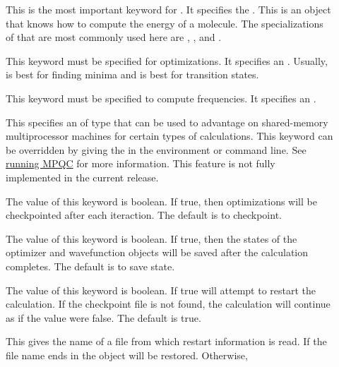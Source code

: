 \begin{description}
\item[] This is the most important keyword for .
        It specifies the 
        .  This is an object that knows how to
        compute the energy of a molecule.  The specializations of
         that are most commonly used here are
        , , and .
\item[] This keyword must be specified for optimizations.  It
        specifies an  .
        Usually,  is best for finding minima and
         is best for transition states.
\item[] This keyword must be specified to compute frequencies.
        It specifies an 
        .
\item[] This specifies an  of type
         that can be used to advantage on shared-memory
        multiprocessor machines for certain types of calculations.  This
        keyword can be overridden by giving the  in the
        environment or command line.  See
        \hyperref{the section on running MPQC}{Section~}{}{running MPQC}
        for more information.
        This feature is not fully implemented in the current release.
\item[] The value of this keyword is boolean.  If true,
        then optimizations will be checkpointed after each iteraction.  The
        default is to checkpoint.
\item[] The value of this keyword is boolean.  If true,
        then the states of the optimizer and wavefunction objects will be
        saved after the calculation completes.  The default is to save
        state.
\item[] The value of this keyword is boolean.  If true
         will attempt to restart the calculation.  If the
        checkpoint file is not found, the calculation will continue as if
        the value were false. The default is true.
\item[] This gives the name of a file from which
        restart information is read.  If the file name ends in
         the  object will be restored.  Otherwise,

\end{description}
